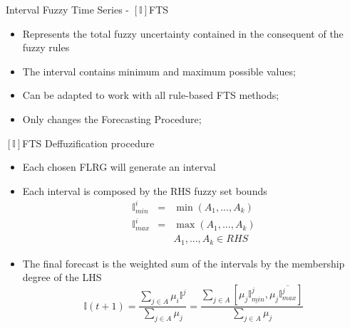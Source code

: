 \documentclass{beamer}
\begin{document}



\begin{frame}{Interval Fuzzy Time Series  - $[\mathbb{I}]$FTS}
\linespread{2}
\begin{itemize}
\item Represents the total fuzzy uncertainty contained in the consequent of the fuzzy rules
\item The interval contains minimum and maximum possible values;
\item Can be adapted to work with all rule-based FTS methods;
\item Only changes the Forecasting Procedure;
\end{itemize}
\end{frame}



\begin{frame}{$[\mathbb{I}]$FTS Deffuzification procedure}
\linespread{1.5}
\begin{itemize}
\item Each chosen FLRG will generate an interval 
\item Each interval is composed by the RHS fuzzy set bounds
$$
\begin{array}{lcr}
\mathbb{I}^i_{min} & = & \min( A_1, ..., A_k ) \\
\mathbb{I}^i_{max} & = & \max( A_1, ..., A_k ) \\ 
& & A_1, ..., A_k \in RHS 
\end{array}
$$
\item The final forecast is the weighted sum of the intervals by the membership degree of the LHS
$$
\mathbb{I}(t+1) = \frac{\sum_{j \in A} \mu_i \mathbb{I}^j}{\sum_{j \in A} \mu_j} = \frac{\sum_{j \in A} [\mu_j\underline{\mathbb{I}^j_{min}} , \mu_j\overline{\mathbb{I}^j_{max}}] }{\sum_{j \in A} \mu_j}
\label{eqn:ifts}
$$
\end{itemize}
\end{frame}
\end{document}
